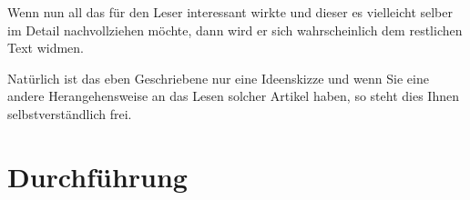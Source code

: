 \documentclass[10pt,twocolumn]{scrartcl}
\begin{document}
Wenn nun all das für den Leser interessant wirkte und dieser es vielleicht
selber im Detail nachvollziehen möchte, dann wird er sich wahrscheinlich
dem restlichen Text widmen.

Natürlich ist das eben Geschriebene nur eine Ideenskizze und wenn
Sie eine andere Herangehensweise an das Lesen solcher Artikel haben,
so steht dies Ihnen selbstverständlich frei.

\section*{Durchführung}

%
%
%
%
%
\end{document}
